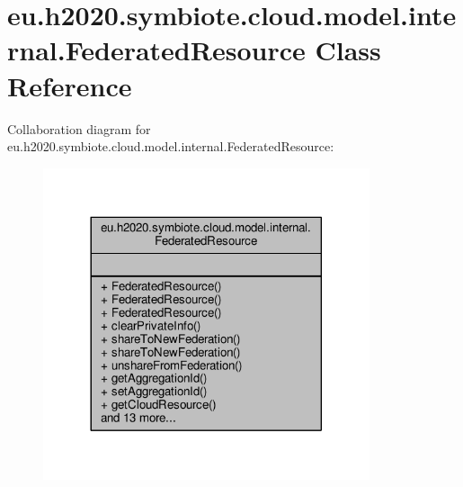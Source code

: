 \hypertarget{classeu_1_1h2020_1_1symbiote_1_1cloud_1_1model_1_1internal_1_1FederatedResource}{}\section{eu.\+h2020.\+symbiote.\+cloud.\+model.\+internal.\+Federated\+Resource Class Reference}
\label{classeu_1_1h2020_1_1symbiote_1_1cloud_1_1model_1_1internal_1_1FederatedResource}


Collaboration diagram for eu.\+h2020.\+symbiote.\+cloud.\+model.\+internal.\+Federated\+Resource\+:\nopagebreak
\begin{figure}[H]
\begin{center}
\leavevmode
\includegraphics[width=272pt]{classeu_1_1h2020_1_1symbiote_1_1cloud_1_1model_1_1internal_1_1FederatedResource__coll__graph}
\end{center}
\end{figure}
